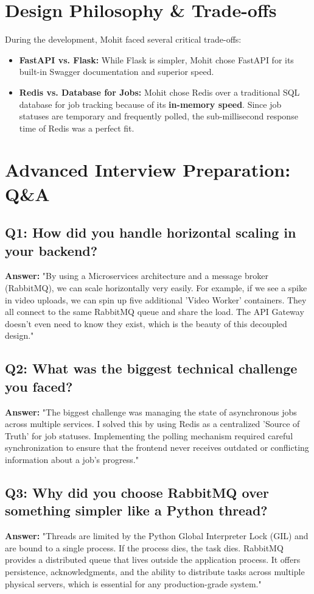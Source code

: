 \documentclass[12pt]{article}
\begin{document}
\section{Design Philosophy & Trade-offs}
During the development, Mohit faced several critical trade-offs:
\begin{itemize}
    \item \textbf{FastAPI vs. Flask:} While Flask is simpler, Mohit chose FastAPI for its built-in Swagger documentation and superior speed.
    \item \textbf{Redis vs. Database for Jobs:} Mohit chose Redis over a traditional SQL database for job tracking because of its \textbf{in-memory speed}. Since job statuses are temporary and frequently polled, the sub-millisecond response time of Redis was a perfect fit.
\end{itemize}

\section{Advanced Interview Preparation: Q&A}

\subsection{Q1: How did you handle horizontal scaling in your backend?}
\textbf{Answer:} "By using a Microservices architecture and a message broker (RabbitMQ), we can scale horizontally very easily. For example, if we see a spike in video uploads, we can spin up five additional 'Video Worker' containers. They all connect to the same RabbitMQ queue and share the load. The API Gateway doesn't even need to know they exist, which is the beauty of this decoupled design."

\subsection{Q2: What was the biggest technical challenge you faced?}
\textbf{Answer:} "The biggest challenge was managing the state of asynchronous jobs across multiple services. I solved this by using Redis as a centralized 'Source of Truth' for job statuses. Implementing the polling mechanism required careful synchronization to ensure that the frontend never receives outdated or conflicting information about a job's progress."

\subsection{Q3: Why did you choose RabbitMQ over something simpler like a Python thread?}
\textbf{Answer:} "Threads are limited by the Python Global Interpreter Lock (GIL) and are bound to a single process. If the process dies, the task dies. RabbitMQ provides a distributed queue that lives outside the application process. It offers persistence, acknowledgments, and the ability to distribute tasks across multiple physical servers, which is essential for any production-grade system."
\end{document}

